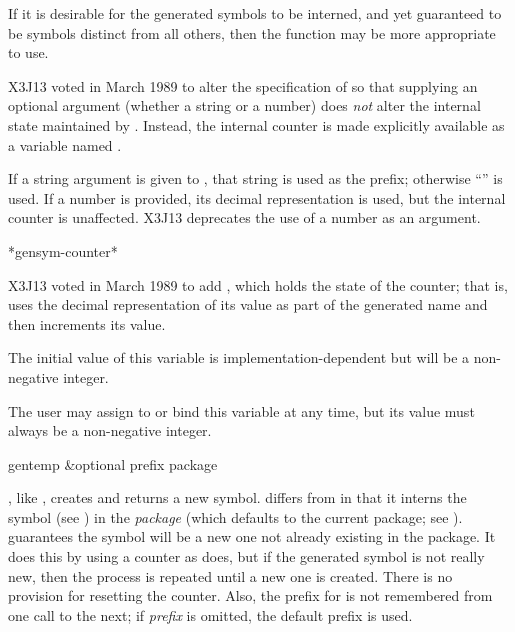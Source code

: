 \begin{defun}[Function]
If it is desirable
for the generated symbols to be interned, and yet guaranteed to be
symbols distinct from all others,
then the function 
may be more appropriate to use.

\begin{newer}
X3J13 voted in March 1989 
to alter the specification of  so that supplying an
optional argument (whether a string or a number) does \emph{not} alter
the internal state maintained by .
Instead, the internal
counter is made explicitly available as a variable named .

If a string argument is given to , that string is used as the prefix;
otherwise ``'' is used.  If a number is provided, its decimal
representation is used, but the internal counter is unaffected.
X3J13 deprecates the use of a number as an argument.
\end{newer}
\end{defun}

\begin{newer}
\begin{defun}[Variable]
*gensym-counter*

X3J13 voted in March 1989 
to add , which
holds the state of the  counter; that is, 
uses the decimal representation of its value as part of the generated name
and then increments its value.

The initial value of this variable is implementation-dependent
but will be a non-negative integer.

The user may assign to or bind this variable at any time, but its value
must always be a non-negative integer.
\end{defun}
\end{newer}

\begin{defun}[Function]
gentemp &optional prefix package

, like , creates and returns a new symbol.
 differs from  in that it interns the symbol
(see ) in the \emph{package} (which defaults to the current
package; see ).   guarantees the symbol
will be a new one not already existing in the package.  It does this
by using a counter as  does, but if the generated symbol
is not really new, then the process is repeated until a new one is created.
There is no provision for resetting the  counter.
Also, the prefix for  is not remembered from one call
to the next; if \emph{prefix} is omitted, the default prefix  is used.
\end{defun}

